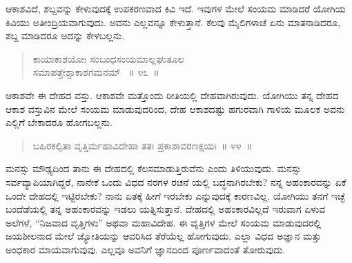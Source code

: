 \vspace{-0.4cm}


\vspace{0.1cm}

ಆಕಾಶವಿದೆ, ಶಬ್ದವನ್ನು ಕೇಳುವುದಕ್ಕೆ ಉಪಕರಣವಾದ ಕಿವಿ ಇದೆ. ಇವುಗಳ ಮೇಲೆ ಸಂಯಮ ಮಾಡಿದರೆ ಯೋಗಿಯ ಕಿವಿಯು ಅತೀಂದ್ರಿಯವಾಗುವುದು. ಅವನು ಎಲ್ಲವನ್ನೂ ಕೇಳುತ್ತಾನೆ. ಕೆಲವು ಮೈಲಿಗಳಾಚೆ ಏನು ಮಾತನಾಡಿದರೂ, ಶಬ್ದ ಮಾಡಿದರೂ ಅದನ್ನು ಕೇಳಬಲ್ಲನು. 

\vspace{-0.3cm}

\begin{verse}
ಕಾಯಾಕಾಶಯೋಃ ಸಂಬಂಧಸಂಯಮಾಲ್ಲಘುತೂಲ\\ ಸಮಾಪತ್ತೇಶ್ಚಾಕಾಶಗಮನಮ್​~ \hfill{॥ ೪೩~॥}
\end{verse}

\vspace{-0.4cm}


\vspace{0.1cm}

ಆಕಾಶವೇ ಈ ದೇಹದ ವಸ್ತು. ಆಕಾಶವೇ ಮತ್ತೊಂದು ರೀತಿಯಲ್ಲಿ ದೇಹವಾಗಿರುವುದು. ಯೋಗಿಯು ತನ್ನ ದೇಹದ ಆಕಾಶ ವಸ್ತುವಿನ ಮೇಲೆ ಸಂಯಮ ಮಾಡುವುದರಿಂದ, ದೇಹ ಆಕಾಶದಷ್ಟು ಹಗುರವಾಗಿ ಗಾಳಿಯ ಮೂಲಕ ಅವನು ಎಲ್ಲಿಗೆ ಬೇಕಾದರೂ ಹೋಗಬಲ್ಲನು. 

\vspace{-0.3cm}

\begin{verse}
ಬಹಿರಕಲ್ಪಿತಾ ವೃತ್ತಿರ್ಮಹಾವಿದೇಹಾ ತತಃ ಪ್ರಕಾಶಾವರಣಕ್ಷಯಃ~॥ ೪೪~॥
\end{verse}

\vspace{-0.4cm}


\vspace{0.1cm}

ಮನಸ್ಸು ಮೌಢ್ಯದಿಂದ ತಾನು ಈ ದೇಹದಲ್ಲಿ ಕೆಲಸಮಾಡುತ್ತಿರುವೆನು ಎಂದು ತಿಳಿಯುವುದು. ಮನಸ್ಸು ಸರ್ವವ್ಯಾಪಿಯಾಗಿದ್ದರೆ, ನಾನೇಕೆ ಒಂದು ವಿಧದ ನರಗಳ ರಚನೆ ಯಲ್ಲಿ ಬದ್ಧನಾಗಿರಬೇಕು? ನನ್ನ ಅಹಂಕಾರವನ್ನು ಏಕೆ ಒಂದೇ ದೇಹದಲ್ಲಿ ಇಟ್ಟಿರಬೇಕು? ನಾನು ಏತಕ್ಕೆ ಹೀಗೆ ಇರಬೇಕು ಎನ್ನುವುದಕ್ಕೆ ಕಾರಣವಿಲ್ಲ. ಯೋಗಿಯು ತನಗೆ ಇಚ್ಛೆ ಬಂದೆಡೆಯಲ್ಲಿ ತನ್ನ ಅಹಂಕಾರವನ್ನು ಇಡಲು ಯತ್ನಿಸುತ್ತಾನೆ. ದೇಹದಲ್ಲಿ ಅಹಂಕಾರವಿಲ್ಲದೆ ಇರುವಾಗ ಏಳುವ ಅಲೆಗಳೆ, “ನಿಜವಾದ ವೃತ್ತಿಗಳು” ಅಥವಾ ಮಹಾವಿದೇಹ. ಈ ವೃತ್ತಿಗಳ ಮೇಲೆ ಸಂಯಮ ಮಾಡುವುದರಲ್ಲಿ ಜಯಶೀಲನಾದ ಮೇಲೆ ಜ್ಯೋತಿಯನ್ನು ಆವರಿಸಿದ ತೆರೆಯೆಲ್ಲ ಹೋಗುವುದು. ಎಲ್ಲಾ ವಿಧದ ಅಜ್ಞಾನ ಮತ್ತು ಅಂಧಕಾರ ಮಾಯವಾಗುವುವು. ಎಲ್ಲವೂ ಅವನಿಗೆ ಜ್ಞಾನದಿಂದ ಪೂರ್ಣವಾದಂತೆ ತೋರುವುದು. 


